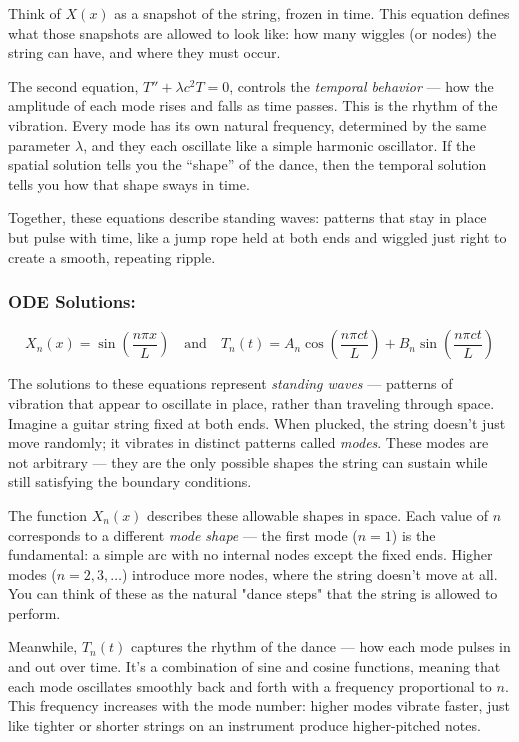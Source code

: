 Think of \( X(x) \) as a snapshot of the string, frozen in time. This equation defines what those snapshots are allowed to look like: how many wiggles (or nodes) the string can have, and where they must occur.

The second equation, \( T'' + \lambda c^2 T = 0 \), controls the \textit{temporal behavior} — how the amplitude of each mode rises and falls as time passes. This is the rhythm of the vibration. Every mode has its own natural frequency, determined by the same parameter \( \lambda \), and they each oscillate like a simple harmonic oscillator. If the spatial solution tells you the “shape” of the dance, then the temporal solution tells you how that shape sways in time.

Together, these equations describe standing waves: patterns that stay in place but pulse with time, like a jump rope held at both ends and wiggled just right to create a smooth, repeating ripple.


\subsubsection{ODE Solutions:}

\[
X_n(x) = \sin\left(\frac{n\pi x}{L}\right)
\quad \text{and} \quad
T_n(t) = A_n \cos\left(\frac{n\pi c t}{L}\right) + B_n \sin\left(\frac{n\pi c t}{L}\right)
\]

The solutions to these equations represent \textit{standing waves} — patterns of vibration that appear to oscillate in place, rather than traveling through space. Imagine a guitar string fixed at both ends. When plucked, the string doesn't just move randomly; it vibrates in distinct patterns called \textit{modes}. These modes are not arbitrary — they are the only possible shapes the string can sustain while still satisfying the boundary conditions.

The function \( X_n(x) \) describes these allowable shapes in space. Each value of \( n \) corresponds to a different \textit{mode shape} — the first mode (\( n = 1 \)) is the fundamental: a simple arc with no internal nodes except the fixed ends. Higher modes (\( n = 2, 3, \ldots \)) introduce more nodes, where the string doesn’t move at all. You can think of these as the natural "dance steps" that the string is allowed to perform.

Meanwhile, \( T_n(t) \) captures the rhythm of the dance — how each mode pulses in and out over time. It’s a combination of sine and cosine functions, meaning that each mode oscillates smoothly back and forth with a frequency proportional to \( n \). This frequency increases with the mode number: higher modes vibrate faster, just like tighter or shorter strings on an instrument produce higher-pitched notes.

